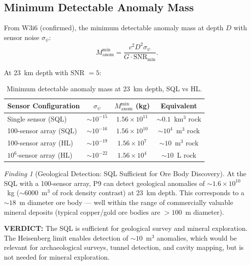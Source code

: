 \documentclass[11pt]{article}
\theoremstyle{definition}
\theoremstyle{remark}
\newtheorem{finding}[theorem]{Finding}
\newcommand{\ee}[1]{\times10^{#1}}
\newcommand{\verdict}[1]{\textcolor{green!50!black}{\textbf{VERDICT:} #1}}
\begin{document}
\subsection{Minimum Detectable Anomaly Mass}

From W3i6 (confirmed), the minimum detectable anomaly mass at depth $D$
with sensor noise $\sigma_\psi$:
\begin{equation}
M_{\mathrm{anom}}^{\min} = \frac{c^2 D^2 \sigma_\psi}{G \cdot \mathrm{SNR}_{\min}}.
\label{eq:M-anom-min}
\end{equation}

At 23~km depth with SNR $= 5$:

\begin{table}[H]
\centering
\caption{Minimum detectable anomaly mass at 23~km depth, SQL vs HL.}
\label{tab:P9-geo-SQL}
\begin{tabular}{@{}lccc@{}}
\toprule
Sensor Configuration & $\sigma_\psi$ & $M_{\mathrm{anom}}^{\min}$ (kg)
  & Equivalent \\
\midrule
Single sensor (SQL) & $\sim 10^{-15}$ & $1.56\ee{11}$ & $\sim 0.1$~km$^3$ rock \\
100-sensor array (SQL) & $\sim 10^{-16}$ & $1.56\ee{10}$ & $\sim 10^4$~m$^3$ rock \\
100-sensor array (HL) & $\sim 10^{-19}$ & $1.56\ee{7}$ & $\sim 10$~m$^3$ rock \\
$10^6$-sensor array (HL) & $\sim 10^{-22}$ & $1.56\ee{4}$ & $\sim 10$~L rock \\
\bottomrule
\end{tabular}
\end{table}

\begin{finding}[Geological Detection: SQL Sufficient for Ore Body Discovery]
\label{find:P9-geo-SQL}
At the SQL with a 100-sensor array, P9 can detect geological anomalies of
$\sim 1.6\ee{10}$~kg ($\sim 6000$~m$^3$ of rock density contrast) at 23~km
depth. This corresponds to a $\sim 18$~m diameter ore body --- well within
the range of commercially valuable mineral deposits (typical copper/gold
ore bodies are $>100$~m diameter).

\verdict{The SQL is sufficient for geological survey and mineral
exploration. The Heisenberg limit enables detection of $\sim 10$~m$^3$
anomalies, which would be relevant for archaeological surveys, tunnel
detection, and cavity mapping, but is not needed for mineral exploration.}
\end{finding}

\end{document}
